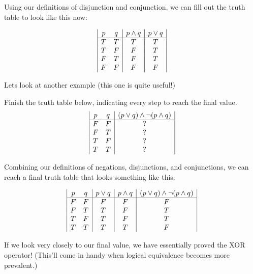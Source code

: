 Using our definitions of disjunction and conjunction, we can fill out the truth table to look like this now:

\begin{displaymath}
\begin{array}{|c c|c|c|}
p & q & p \land q & p \lor q\\ %
\hline %
T & T & T & T\\
T & F & F & T\\
F & T & F & T\\
F & F & F & F\\
\end{array}
\end{displaymath}

Lets look at another example (this one is quite useful!)

\begin{example}
    Finish the truth table below, indicating every step to reach the final value.
    \begin{displaymath}
    \begin{array}{|c c|c|}
    p & q & (p \lor q)\land \neg{(p \land q)}\\ 
    \hline
    F & F & ?\\
    F & T & ?\\
    T & F & ?\\
    T & T & ?\\
    \end{array}
    \end{displaymath}
\end{example}

Combining our definitions of negations, disjunctions, and conjunctions, we can reach a final truth table that looks something like this:

\begin{displaymath}
    \begin{array}{|c c|c|c|c|}
    p & q & p \lor q & p \land q &(p \lor q)\land \neg{(p \land q)}\\ 
    \hline
    F & F & F & F & F\\
    F & T & T & F & T\\
    T & F & T & F & T\\
    T & T & T & T & F\\
    \end{array}
    \end{displaymath}

If we look very closely to our final value, we have essentially proved the XOR operator! (This'll come in handy when logical equivalence becomes more prevalent.)
